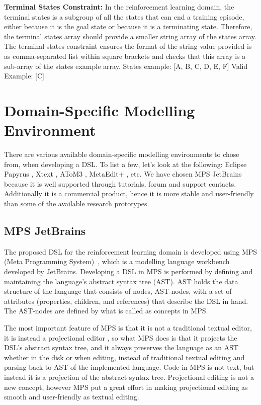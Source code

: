 \documentclass[11pt,letterpaper]{ryersonSGSThesis}
\begin{document}
\begin{ryersonSGSThesis}
        \textbf{Terminal States Constraint:} In the reinforcement learning domain, the terminal states is a subgroup of all the states that can end a training episode, either because it is the goal state or because it is a terminating state. Therefore, the terminal states array should provide a smaller string array of the states array. The terminal states constraint ensures the format of the string value provided is as comma-separated list within square brackets and checks that this array is a sub-array of the states example array.\newline
        States example: [A, B, C, D, E, F]\newline
        Valid Example: [C]

\chapter{Domain-Specific Modelling Environment}
    There are various available domain-specific modelling environments to chose from, when developing a DSL. To list a few, let's look at the following: Eclipse Papyrus \cite{Papyrus}, Xtext \cite{Xtext}, AToM3 \cite{AToM3}, MetaEdit+ \cite{MetaEdit+}, etc. We have chosen MPS JetBrains because it is well supported through tutorials, forum and support contacts. Additionally it is a commercial product, hence it is more stable and user-friendly than some of the available research prototypes.
    
    \label{chap:MPS}
    \section{MPS JetBrains}
        The proposed DSL for the reinforcement learning domain is developed using MPS (Meta Programming System)~\cite{MPS}, which is a modelling language workbench developed by JetBrains. Developing a DSL in MPS is performed by defining and maintaining the language's abstract syntax tree (AST). AST holds the data structure of the language that consists of nodes, AST-nodes, with a set of attributes (properties, children, and references) that describe the DSL in hand. The AST-nodes are defined by what is called as concepts in MPS.
        
        The most important feature of MPS is that it is not a traditional textual editor, it is instead a projectional editor \cite{MPS}, so what MPS does is that it projects the DSL's abstract syntax tree, and it always preserves the language as an AST whether in the disk or when editing, instead of traditional textual editing and parsing back to AST of the implemented language. Code in MPS is not text, but instead it is a projection of the abstract syntax tree. Projectional editing is not a new concept, however MPS put a great effort in making projectional editing as smooth and user-friendly as textual editing.
    

\end{ryersonSGSThesis}
\end{document}
